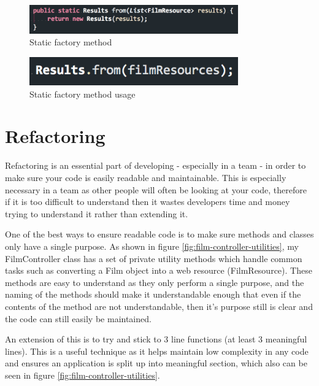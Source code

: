 \documentclass[12pt]{article}
\begin{document}
    \begin{figure}[ht]
      \centering
      \includegraphics[width=9cm]{static-factory}
      \caption{Static factory method}
      \label{fig:static-factory}
    \end{figure}

    \begin{figure}[ht]
      \centering
      \includegraphics[width=9cm]{static-factory-usage}
      \caption{Static factory method usage}
      \label{fig:static-factory-usage}
    \end{figure}

\section{Refactoring}
  Refactoring is an essential part of developing - especially in a team - in order to make sure your code is easily readable and maintainable. This is especially necessary in a team as other people will often be looking at your code, therefore if it is too difficult to understand then it wastes developers time and money trying to understand it rather than extending it.

  One of the best ways to ensure readable code is to make sure methods and classes only have a single purpose. As shown in figure \ref{fig:film-controller-utilities}, my FilmController class has a set of private utility methods which handle common tasks such as converting a Film object into a web resource (FilmResource). These methods are easy to understand as they only perform a single purpose, and the naming of the methods should make it understandable enough that even if the contents of the method are not understandable, then it's purpose still is clear and the code can still easily be maintained.

  An extension of this is to try and stick to 3 line functions (at least 3 meaningful lines). This is a useful technique as it helps maintain low complexity in any code and ensures an application is split up into meaningful section, which also can be seen in figure \ref{fig:film-controller-utilities}.
\end{document}
